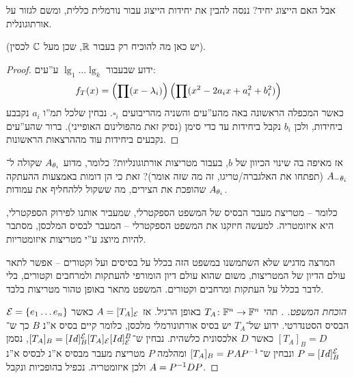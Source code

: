 \documentclass[]{../../../../tex/classes/styledArticle}
\begin{document}
	אבל האם הייצוג יחיד? ננסה להבין את יחידות הייצוג עבור נורמלית כללית, ומשם לגזור על אורתוגונלית. 
	
	
	(יש כאן מה להוכיח רק בעבור $\mathbb{R}$, שכן מעל $\mathbb{C}$ לכסין). 
	\begin{proof}
		ידוע שבעבור $\lg_1 \dots \lg_k$ ע''עים: 
		\[ f_T(x) = \left ( \prod (x - \lambda_i) \right ) \left ( \prod (x^2 - 2a_ix + a_i^2 + b_i^2) \right ) \]
		כאשר המכפלה הראשונה באה מהע''עים והשניה מהריבועים $\square_i$. נבחין שלכל תמ''ו $a_i$ נקבבע ביחידות, ולכן $b_i$ נקבל ביחידות עד כדי סימן (נסיק זאת מהפולינום האופייני). ברור שהע''עים נקבעים ביחידות עוד מההרצאות הראשונות. 
	\end{proof}
	אז מאיפה בה שינוי הכיוון של $b$, בעבור מטריצות אורתוגונליות? כלומר, מדוע $A_{\theta_i}$ שקולה ל־$A_{-\theta_i}$ (תפתחו את האלגברה/טריגו, זה מה שזה אומר)? זאת כי הן דומות באמצעות ההעתקה שהופכת את הצירים, מה ששקול ללהחליף את עמודות $A_{\theta_i}$. 
	
	כלומר – מטריצת מעבר הבסיס של המשפט הספקטרלי, שמעביר אותנו לפירוק הספקטרלי, היא איזומטריה. למעשה חיזקנו את המשפט הספקטרלי – המעבר לבסיס המלכסן, מסתבר להיות מיוצג ע''י מטריצות איזומטריות. 
	
	המרצה מדגיש שלא השתמשנו במשפט הזה בכלל על בסיסים ועל וקטורים – אפשר לתאר עולם הדיון של המטריצות, משום שהוא עולם דיון הומורפי להעתקות ולמרחבים וקטורים, בלי לדבר בכלל על העתקות ומרחבים וקטורים. המשפט מתאר באופן טהור מטריצות בלבד. 
	
	\begin{proof}[הוכחת המשפט. ]
		תהי $T_A \colon \mathbb{F}^n \to \mathbb{F}^n$ באופן הרגיל. אז $A= [T_A]_{\mathcal{E}}$ כאשר $\mathcal{E} = \{e_1 \dots e_n\}$ הבסיס הסטנדרטי. ידוע של־$T_A$ יש בסיס אורתונורמלי מלכסן, כלומר קיים בסיס א''נ $B$ כך ש־$[T_A]_B = D$ כאשר $D$ אלכסונית כלשהית. נבחין ש־$[T_A]_B = [Id]^{\mathcal{E}}_B [T_A]_{\mathcal{E}} [Id]_{\mathcal{E}}^B$, נסמן $P = [Id]^{\mathcal{E}}_B$ ונבחין ש־$[T_A]_B = PAP^{-1}$ ומהלמה $P$ מטריצת מעבר מבסיס א''נ לבסיס א''נ ולכן איזומטריה. נכפיל בהופכיות ונקבל $A = P^{-1} DP$. 
	\end{proof}
	
\end{document}
